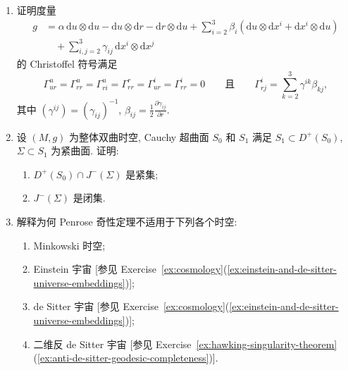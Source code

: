 \begin{RiemannExercise}\label{ex:penrose-singularity-theorem}
\begin{enumerate}[label=(\arabic*),ref=\arabic*,leftmargin=*]
\item\label{ex:christoffel-symbols-in-null-coordinates}
证明度量
\begin{align*}
  g&=\alpha\,\mathrm{d}u\otimes\mathrm{d}u-\mathrm{d}u\otimes\mathrm{d}r
       -\mathrm{d}r\otimes\mathrm{d}u
       +\sum_{i=2}^3\beta_i(\mathrm{d}u\otimes\mathrm{d}x^i+\mathrm{d}x^i\otimes\mathrm{d}u)\\
   &\quad+\sum_{i,j=2}^3\gamma_{ij}\,\mathrm{d}x^i\otimes\mathrm{d}x^j
\end{align*}
的 Christoffel 符号满足
\[
  \Gamma^u_{ur}=\Gamma^u_{rr}=\Gamma^u_{ri}=\Gamma^r_{rr}=\Gamma^i_{ur}=\Gamma^i_{rr}=0
  \qquad\text{且}\qquad
  \Gamma^i_{rj}=\sum_{k=2}^3\gamma^{ik}\beta_{kj},
\]
其中 $(\gamma^{ij})=(\gamma_{ij})^{-1}$, $\beta_{ij}=\frac12\frac{\partial\gamma_{ij}}{\partial r}$.
\item\label{ex:causal-past-of-compact-surface}
设 $(M,g)$ 为整体双曲时空, Cauchy 超曲面 $S_0$ 和 $S_1$ 满足 $S_1\subset D^+(S_0)$, $\Sigma\subset S_1$ 为紧曲面. 证明:
\begin{enumerate}[label=(\alph*),leftmargin=*]
\item $D^+(S_0)\cap J^-(\Sigma)$ 是紧集;
\item $J^-(\Sigma)$ 是闭集.
\end{enumerate}
\item\label{ex:limits-of-penrose-singularity-theorem}
解释为何 Penrose 奇性定理不适用于下列各个时空:
\begin{enumerate}[label=(\alph*),leftmargin=*]
\item Minkowski 时空;
\item Einstein 宇宙 [参见 Exercise~\ref{ex:cosmology}(\ref{ex:einstein-and-de-sitter-universe-embeddings})];
\item de Sitter 宇宙 [参见 Exercise~\ref{ex:cosmology}(\ref{ex:einstein-and-de-sitter-universe-embeddings})];
\item 二维反 de Sitter 宇宙 [参见 Exercise~\ref{ex:hawking-singularity-theorem}(\ref{ex:anti-de-sitter-geodesic-completeness})].
\end{enumerate}
\end{enumerate}
\end{RiemannExercise}
